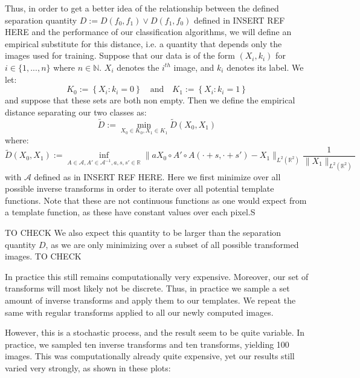 \documentclass{article}
\theoremstyle{definition}
\theoremstyle{remark}
\theoremstyle{proposition}
\begin{document}
            Thus, in order to get a better idea of the relationship between the defined separation quantity $D := D(f_0,f_1) \vee D(f_1,f_0)$ defined in INSERT REF HERE and the performance of our classification algorithms, we will define an empirical substitute for this distance, i.e. a quantity that depends only the images used for training. Suppose that our data is of the form $(X_i,k_i)$ for $i\in \{1,...,n\}$ where $n\in\mathbb{N}$. $X_i$ denotes the $i^{th}$ image, and $k_i$ denotes its label. We let:
            \[
                K_0 := \left\{ X_i : k_i = 0 \right\} \quad \text{and} \quad K_1 := \left\{ X_i : k_i = 1 \right\}
            \]
            and suppose that these sets are both non empty. Then we define the empirical distance separating our two classes as:
            \[
                \tilde{D}:=\min_{X_0 \in K_0, X_1 \in K_1} \tilde{D}(X_0,X_1)
            \]
            where:
            \[
                \tilde{D}(X_0,X_1) := \inf_{A\in\mathcal{A},A' \in \mathcal{A}^{-1},a,s,s'\in \mathbb{R}} \| a X_0 \circ A' \circ A(\cdot + s, \cdot + s') - X_1 \| _{L^2 (\mathbb{R}^2)} \frac{1}{ \| X_1 \| _{L^2 (\mathbb{R}^2)} }
            \]
            with $\mathcal{A}$ defined as in INSERT REF HERE. Here we first minimize over all possible inverse transforms in order to iterate over all potential template functions. Note that these are not continuous functions as one would expect from a template function, as these have constant values over each pixel.S 
            
            TO CHECK We also expect this quantity to be larger than the separation quantity $D$, as we are only minimizing over a subset of all possible transformed images. TO CHECK

            In practice this still remains computationally very expensive. Moreover, our set of transforms will most likely not be discrete. Thus, in practice we sample a set amount of inverse transforms and apply them to our templates. We repeat the same with regular transforms applied to all our newly computed images.
            
            However, this is a stochastic process, and the result seem to be quite variable. In practice, we sampled ten inverse transforms and ten transforms, yielding 100 images. This was computationally already quite expensive, yet our results still varied very strongly, as shown in these plots:
            
\end{document}
